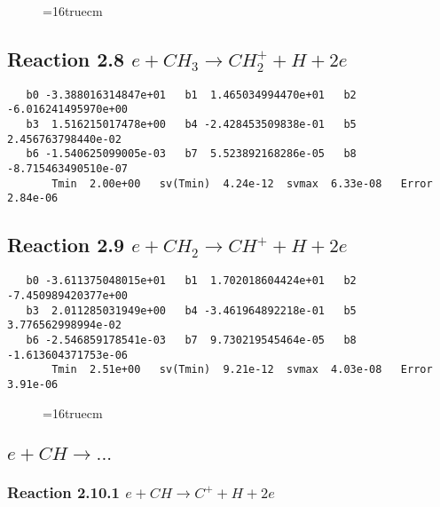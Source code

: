 \documentclass[12pt]{article}
\begin{document}
\begin{figure} \label{met.2_2.5}
\epsfxsize=16truecm
\end{figure}
\newpage
 
\subsection{ 
Reaction 2.8      $e + CH_3 \rightarrow CH_2^+ + H + 2e$
}

\begin{small}\begin{verbatim} 
   b0 -3.388016314847e+01   b1  1.465034994470e+01   b2 -6.016241495970e+00
   b3  1.516215017478e+00   b4 -2.428453509838e-01   b5  2.456763798440e-02
   b6 -1.540625099005e-03   b7  5.523892168286e-05   b8 -8.715463490510e-07
       Tmin  2.00e+00   sv(Tmin)  4.24e-12  svmax  6.33e-08   Error  2.84e-06
\end{verbatim}\end{small}

\subsection{ 
Reaction 2.9      $e + CH_2 \rightarrow CH^+ + H + 2e$
}

\begin{small}\begin{verbatim} 
   b0 -3.611375048015e+01   b1  1.702018604424e+01   b2 -7.450989420377e+00
   b3  2.011285031949e+00   b4 -3.461964892218e-01   b5  3.776562998994e-02
   b6 -2.546859178541e-03   b7  9.730219545464e-05   b8 -1.613604371753e-06
       Tmin  2.51e+00   sv(Tmin)  9.21e-12  svmax  4.03e-08   Error  3.91e-06
\end{verbatim}\end{small}

\begin{figure} \label{met.2_2.8}
\epsfxsize=16truecm
\end{figure}
\newpage
 

\subsection{
$e + CH \rightarrow ... $ 
}

\subsubsection{
Reaction 2.10.1   $e + CH \rightarrow C^+ + H + 2e$
}
\end{document}
